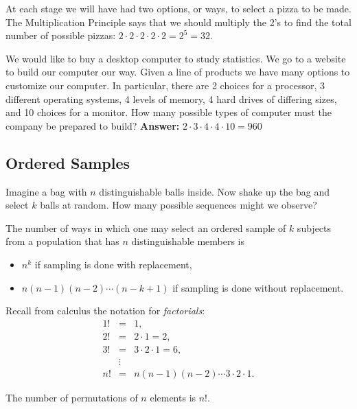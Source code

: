 At each stage we will have had two options, or ways, to select a pizza
to be made. The Multiplication Principle says that we should multiply
the 2's to find the total number of possible pizzas: \(2 \cdot 2 \cdot
2 \cdot 2 \cdot 2 = 2^{5} = 32\).




We would like to buy a desktop computer to study statistics. We go to
a website to build our computer our way. Given a line of products we
have many options to customize our computer. In particular, there are
2 choices for a processor, 3 different operating systems, 4 levels of
memory, 4 hard drives of differing sizes, and 10 choices for a
monitor. How many possible types of computer must the company be
prepared to build? \textbf{Answer:} \(2 \cdot 3 \cdot 4 \cdot 4 \cdot 10 = 960\)

\subsection{Ordered Samples}
\label{sec-4-5-1}

Imagine a bag with \(n\) distinguishable balls inside. Now shake up
the bag and select \(k\) balls at random. How many possible sequences
might we observe?

\begin{prop}
The number of ways in which one may select an ordered sample of \(k\)
subjects from a population that has \(n\) distinguishable members is
\begin{itemize}
\item \(n^{k}\) if sampling is done with replacement,
\item \(n(n-1)(n-2)\cdots(n-k+1)\) if sampling is done without
replacement.
\end{itemize}
\end{prop}

Recall from calculus the notation for \emph{factorials}: 
\begin{eqnarray*}
1! & = & 1,\\
2! & = & 2 \cdot 1 = 2,\\
3! & = & 3 \cdot 2 \cdot 1 = 6,\\
 & \vdots\\
n! & = & n(n - 1)(n - 2) \cdots 3 \cdot 2 \cdot 1.
\end{eqnarray*}

\begin{fact}
The number of permutations of \(n\) elements is \(n!\).
\end{fact}


